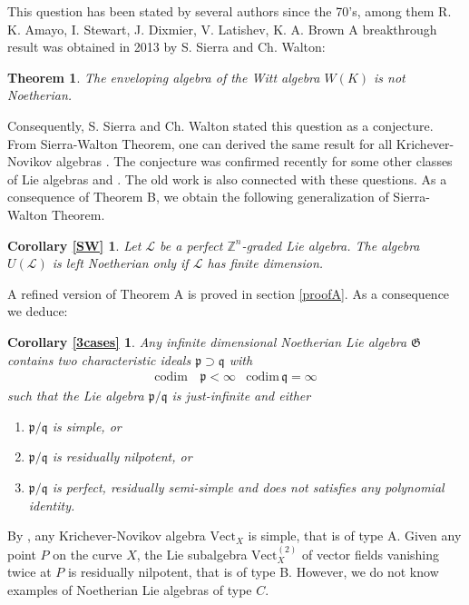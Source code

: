\documentclass[11pt, letterpaper, reqno]{amsart}
\newtheorem{theorem}{Theorem}
\newtheorem*{corSW}{Corollary \ref{SW}}
\newtheorem*{cor3cases}{Corollary \ref{3cases}}
\theoremstyle{definition}
\newcommand{\Z}{{\mathbb Z}}
\newcommand{\cL}{\mathcal L}
\newcommand{\fp}{\mathfrak{p}}
\newcommand{\fq}{\mathfrak{q}}
\newcommand{\fG}{\mathfrak{G}}
\newcommand{\codim}{\mathrm{codim}}
\newcommand{\Vect}{\mathrm{Vect}}
\begin{document}
This question has been stated by several authors since the 70's, among them 
R. K. Amayo, I. Stewart, J. Dixmier, V. Latishev, K. A. Brown \cite{Amayo-Stewart, Brown} 
A  breakthrough result was obtained in 2013 by S. Sierra and Ch. Walton:

\begin{theorem}\label{SWthm} \cite{Sierra-Walton}
The enveloping algebra of the Witt algebra $W(K)$
is not Noetherian.
\end{theorem}


Consequently, S. Sierra and Ch. Walton stated this question as a conjecture.
From Sierra-Walton Theorem, one can derived the same result for all Kri\-che\-ver-Novikov algebras \cite{Buzaglo}.
The conjecture was confirmed recently for some other classes of Lie algebras 
\cite{BellBuz1,BellBuz2} and \cite{AndMath}. The old work \cite{U} is also 
connected with these questions. 
As a consequence of Theorem B, we obtain the following generalization of Sierra-Walton Theorem.

\begin{corSW} Let $\cL$ be a perfect 
$\Z^n$-graded Lie algebra. 
The algebra $U(\cL)$ is left Noetherian
only if $\cL$ has finite dimension.
\end{corSW}

A refined version of Theorem A is proved in section
\ref{proofA}. As a consequence we deduce:

\begin{cor3cases}  Any infinite dimensional Noetherian Lie algebra $\fG$ contains two characteristic ideals $\fp\supset\fq$ with
\begin{align*}
\codim&\, \fp<\infty & \codim\,\fq=\infty
\end{align*} 
\noindent such that the  Lie algebra $\fp/\fq$ 
is just-infinite and  either

\begin{enumerate}
\item[(type A)] $\fp/\fq$ is simple, or

\item[(type B)] $\fp/\fq$ is residually nilpotent, or

\item[(type C)] $\fp/\fq$ is perfect, residually semi-simple
and does not satisfies any polynomial identity.
\end{enumerate} 
\end{cor3cases}

\noindent By \cite{Grab1}, any Krichever-Novikov algebra
$\Vect_X$ is simple, that is of type A. Given any point
 $P$ on the curve $X$, the Lie subalgebra $\Vect_X^{(2)}$ of vector fields vanishing twice at $P$ is residually nilpotent,
 that is of type B.  However, we do not know examples of Noetherian Lie algebras of type $C$.
\end{document}

